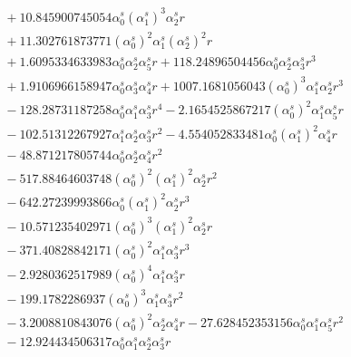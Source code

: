 \documentclass[10pt]{article}
\begin{document}
\begin{align*}
&{}  + 10.845900745054 \alpha_{0}^s \left(\alpha_{1}^s\right)^{3} \alpha_{2}^s r \\
&{}  + 11.302761873771 \left(\alpha_{0}^s\right)^{2} \alpha_{1}^s \left(\alpha_{2}^s\right)^{2} r \\
&{}  + 1.6095334633983 \alpha_{0}^s \alpha_{2}^s \alpha_{5}^s r + 118.24896504456 \alpha_{0}^s \alpha_{2}^s \alpha_{3}^s r^{3} \\
&{}  + 1.9106966158947 \alpha_{0}^s \alpha_{3}^s \alpha_{4}^s r + 1007.1681056043 \left(\alpha_{0}^s\right)^{3} \alpha_{1}^s \alpha_{2}^s r^{3} \\
&{}  - 128.28731187258 \alpha_{0}^s \alpha_{1}^s \alpha_{3}^s r^{4} - 2.1654525867217 \left(\alpha_{0}^s\right)^{2} \alpha_{1}^s \alpha_{5}^s r \\
&{}  - 102.51312267927 \alpha_{1}^s \alpha_{2}^s \alpha_{3}^s r^{2} - 4.554052833481 \alpha_{0}^s \left(\alpha_{1}^s\right)^{2} \alpha_{4}^s r \\
&{}  - 48.871217805744 \alpha_{0}^s \alpha_{2}^s \alpha_{4}^s r^{2} \\
&{}  - 517.88464603748 \left(\alpha_{0}^s\right)^{2} \left(\alpha_{1}^s\right)^{2} \alpha_{2}^s r^{2} \\
&{}  - 642.27239993866 \alpha_{0}^s \left(\alpha_{1}^s\right)^{2} \alpha_{2}^s r^{3} \\
&{}  - 10.571235402971 \left(\alpha_{0}^s\right)^{3} \left(\alpha_{1}^s\right)^{2} \alpha_{2}^s r \\
&{}  - 371.40828842171 \left(\alpha_{0}^s\right)^{2} \alpha_{1}^s \alpha_{3}^s r^{3} \\
&{}  - 2.9280362517989 \left(\alpha_{0}^s\right)^{4} \alpha_{1}^s \alpha_{3}^s r \\
&{}  - 199.1782286937 \left(\alpha_{0}^s\right)^{3} \alpha_{1}^s \alpha_{3}^s r^{2} \\
&{}  - 3.2008810843076 \left(\alpha_{0}^s\right)^{2} \alpha_{2}^s \alpha_{4}^s r - 27.628452353156 \alpha_{0}^s \alpha_{1}^s \alpha_{5}^s r^{2} \\
&{}  - 12.924434506317 \alpha_{0}^s \alpha_{1}^s \alpha_{2}^s \alpha_{3}^s r
\end{align*}
\end{document}
